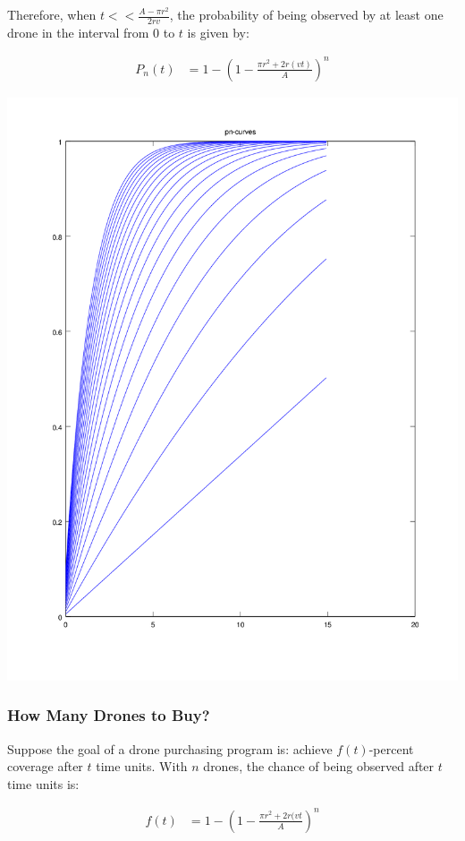 \documentclass{article}
\begin{document}
Therefore, when $t << \frac{A - \pi r^2}{2 r v}$, the probability
	of being observed by at least one drone in the interval from $0$ to $t$
	is given by:

\begin{align}
P_n(t) & = 1 - \left( 1 - \frac{\pi r^2 + 2 r (v t)}{A}\right)^n
\end{align}

\includegraphics[width=\textwidth]{pn-curves.png}

\subsubsection{How Many Drones to Buy?}

Suppose the goal of a drone purchasing program is:
	achieve $f(t)$-percent coverage after $t$ time units.
With $n$ drones, the chance of being observed after $t$ time units is:

\begin{align}
f(t) & = 1 - \left( 1 - \frac{\pi r^2 + 2 r (v t}{A} \right)^n
\end{align}
\end{document}
